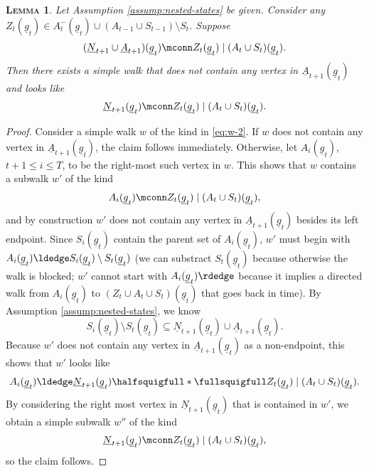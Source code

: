\documentclass[12pt,a4paper]{article}
\newtheorem{lemma}[theorem]{\normalfont\scshape  Lemma}
\theoremstyle{definition}
\begin{document}
\begin{lemma} \label{lem:special-walk-1}
Let Assumption \ref{assump:nested-states} be given. Consider any
$Z_t(\underline{g}_t) \in A^{-}_t(\underline{g}_t) \cup (A_{t-1} \cup
S_{t-1}) \setminus S_t$. Suppose
\begin{equation}
  \label{eq:w-2}
   (\underline{N}_{t+1} \cup \underline{A}_{t+1})(\underline{g}_t)
   \mconn Z_t(\underline{g}_t) \mid (A_t \cup S_t)(\underline{g}_t).
\end{equation}
Then there exists a simple walk that does not contain any vertex in
$\underline{A}_{t+1}(\underline{g}_t)$ and looks like
\[
   \underline{N}_{t+1}(\underline{g}_t) \mconn
   Z_t(\underline{g}_t) \mid (A_t \cup S_t)(\underline{g}_t).
\]
\end{lemma}

\begin{proof}
  Consider a simple walk $w$ of the kind in \eqref{eq:w-2}. If $w$
  does not contain any vertex in
  $\underline{A}_{t+1}(\underline{g}_t)$, the claim follows
  immediately. Otherwise, let $A_{i}(\underline{g}_t)$, $t+1 \leq i
  \leq T$, to be the right-most such vertex in $w$. This shows that
  $w$ contains a
  subwalk $w'$ of the kind
  \[
      A_{i}(\underline{g}_t) \mconn Z_t(\underline{g}_t) \mid
      (A_t \cup S_t)(\underline{g}_t),
  \]
  and by construction $w'$ does not contain any vertex in
  $\underline{A}_{t+1}(\underline{g}_t)$ besides its left endpoint.
  Since $S_{i}(\underline{g}_t)$ contain the parent set of
  $A_{i}(\underline{g}_t)$, $w'$ must begin with
  $A_{i}(\underline{g}_t) \ldedge S_{i}(\underline{g}_t) \setminus
  S_t(\underline{g}_t)$ (we can substract $S_t(\underline{g}_t)$
  because otherwise the walk is blocked; $w'$ cannot start with
  $A_{i}(\underline{g}_t) \rdedge$ because it implies a
  directed walk from $A_{i}(\underline{g}_t)$ to $(Z_t \cup A_t \cup
  S_t)(\underline{g}_t)$ that goes back in time).
  By Assumption \ref{assump:nested-states}, we know
  \[
    S_{i}(\underline{g}_t) \setminus S_t(\underline{g}_t) \subseteq
  \underline{N}_{t+1}(\underline{g}_t) \cup
  \underline{A}_{t+1}(\underline{g}_t).
  \]
  Because $w'$ does not contain any vertex in
  $\underline{A}_{t+1}(\underline{g}_t)$ as a non-endpoint, this
  shows that $w'$ looks like
  \[
    A_i(\underline{g}_t) \ldedge
    \underline{N}_{t+1}(\underline{g}_t) \halfsquigfull \ast
      \fullsquigfull Z_t(\underline{g}_t) \mid (A_t \cup
      S_t)(\underline{g}_t).
    \]
  By considering the right most vertex in
  $\underline{N}_{t+1}(\underline{g}_t)$ that is contained in $w'$,
  we obtain a simple subwalk $w''$ of the kind
  \[
    \underline{N}_{t+1}(\underline{g}_t) \mconn Z_t(\underline{g}_t) \mid (A_t \cup
      S_t)(\underline{g}_t),
  \]
  so the claim follows.
\end{proof}
\end{document}
